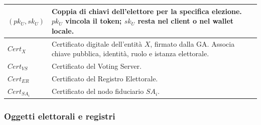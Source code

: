 \documentclass[a4paper,12pt]{article}
\begin{document}
\begin{longtable}{|>{\raggedright\arraybackslash}p{}|>{\raggedright\arraybackslash}p{}|}
    	$(pk_U, sk_U)$       & Coppia di chiavi dell'elettore per la specifica elezione. $pk_U$ vincola il token; $sk_U$ resta nel client o nel wallet locale.                 \\
	\hline
	$Cert_X$                              & Certificato digitale dell'entità $X$, firmato dalla GA. Associa chiave pubblica, identità, ruolo e istanza elettorale.                          \\
	\hline
	$Cert_{VS}$                           & Certificato del Voting Server.                                                                                                                  \\
	\hline
	$Cert_{ER}$                           & Certificato del Registro Elettorale.                                                                                                            \\
	\hline
	$Cert_{SA_i}$                         & Certificato del nodo fiduciario $SA_i$.                                                                                                         \\
	\hline
\end{longtable}

\subsubsection{Oggetti elettorali e registri}
\end{document}
